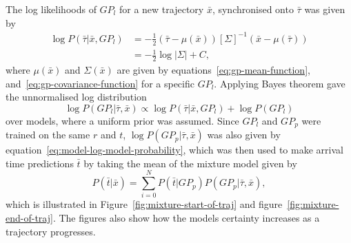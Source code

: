 The log likelihoods of $GP_l$ for a new trajectory $\bar{x}$,
synchronised onto $\bar{\tau}$ was given by
\begin{equation}
  \label{eq:model-log-likelihood}
  \begin{split}
    \log P(\bar{\tau}|\bar{x}, {GP_l}) & = -\frac{1}{2}(\bar{\tau} - \mu(\bar{x})){[\Sigma]}^{-1}(\bar{x} - \mu(\bar{\tau})) \\
    & = -\frac{1}{2}\log{|\Sigma|}+C,
  \end{split}
\end{equation}
where $\mu(\bar{x})$ and $\Sigma(\bar{x})$ are given by
equations~\ref{eq:gp-mean-function},
and~\ref{eq:gp-covariance-function} for a specific ${GP_l}$. Applying Bayes
theorem gave the unnormalised log distribution
\begin{equation}
  \label{eq:model-log-model-probability}
  \log P(GP_l | \bar{\tau}, \bar{x}) \propto \log P(\bar{\tau}|\bar{x}, GP_l) + \log P(GP_l)
\end{equation}
over models, where a uniform prior was assumed. Since
${GP_l}$ and $GP_p$ were trained on the same $r$ and $t$, 
$\log P(GP_p | \bar{\tau}, \bar{x})$ was also given by
equation~\ref{eq:model-log-model-probability}, which was then used to make 
arrival time predictions $\bar{t}$ by taking the mean of the mixture
model given by
\begin{equation}
  \label{eq:model-mixture}
  P(\bar{t}|\bar{x}) = \sum_{i=0}^{N}{P(\bar{t}|GP_p)P(GP_p | \bar{\tau},\bar{x})},
\end{equation}
which is illustrated in Figure~\ref{fig:mixture-start-of-traj} and
figure~\ref{fig:mixture-end-of-traj}. The figures also show how the models certainty
increases as a trajectory progresses.
